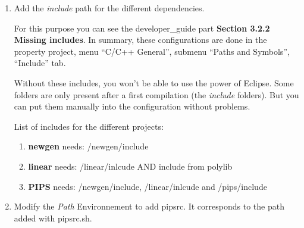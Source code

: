 \documentclass[a4paper]{article}
\begin{document}
\begin{enumerate}
\item Add the \emph{include} path for the different dependencies.

For this purpose you can see the developer\_guide part \textbf{Section 3.2.2 Missing includes}.
In summary, these configurations are done in the property project, menu ``C/C++ General'', submenu ``Paths and Symbols'', ``Include'' tab.

Without these includes, you won't be able to use the power of Eclipse.
Some folders are only present after a first compilation (the \textit{include} folders). 
But you can put them manually into the configuration without problems.

List of includes for the different projects:
\begin{enumerate}
\item \textbf{newgen} needs: /newgen/include
\item \textbf{linear} needs: /linear/inlcude AND include from polylib
\item \textbf{PIPS} needs:   /newgen/include, /linear/inlcude and /pips/include
\end{enumerate}

\item Modify the \emph{Path} Environnement to add pipsrc. It corresponds to the path added with pipsrc.sh.
\label{enum:it:addpath}


\end{enumerate}
\end{document}
